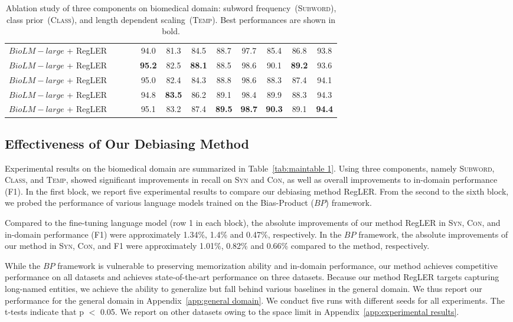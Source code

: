 \documentclass[11pt]{article}
\newcommand{\cmark}{\ding{51}}\newcommand{\xmark}{\ding{55}}\newcommand{\cross}{\ding{61}}\newcommand{\mb}[1]{\textcolor{red}{#1}}
\begin{document}
\begin{table*}[t]
\begin{adjustbox}{width=.9\textwidth}
\begin{tabular}{ l c c c c c c c | c c c c }
$BioLM-large$ + RegLER & \xmark & \xmark & \cmark & 94.0 & 81.3 & 84.5 & 88.7 & 97.7 & 85.4 & 86.8 & 93.8 \\ 
$BioLM-large$ + RegLER & \cmark & \cmark & \xmark & \textbf{95.2} & 82.5 & \textbf{88.1} & 88.5 & 98.6 & 90.1 & \textbf{89.2} & 93.6 \\ 
$BioLM-large$ + RegLER & \cmark & \xmark & \cmark & 95.0 & 82.4 & 84.3 & 88.8 & 98.6 & 88.3 & 87.4 & 94.1 \\ 
$BioLM-large$ + RegLER & \xmark & \cmark & \cmark & 94.8 & \textbf{83.5} & 86.2 & 89.1 & 98.4 & 89.9 & 88.3 &  94.3 \\
$BioLM-large$ + RegLER & \cmark & \cmark & \cmark & 95.1 & 83.2 & 87.4 & \textbf{89.5} & \textbf{98.7} & \textbf{90.3} & 89.1 & \textbf{94.4} \\
\bottomrule
\end{tabular}
\end{adjustbox}
\caption{Ablation study of three components on biomedical domain: subword frequency~(\textsc{Subword}), class prior~(\textsc{Class}), and length dependent scaling~(\textsc{Temp}). Best performances are shown in bold.}
\label{tab:ablation table 1}
\end{table*}


\subsection{Effectiveness of Our Debiasing Method}
Experimental results on the biomedical domain are summarized in Table~\ref{tab:maintable 1}.
Using three components, namely \textsc{Subword}, \textsc{Class}, and \textsc{Temp}, showed significant improvements in recall on \textsc{Syn} and \textsc{Con}, as well as overall improvements to in-domain performance (F1).
In the first block, we report five experimental results to compare our debiasing method RegLER.
From the second to the sixth block, we probed the performance of various language models trained on the Bias-Product ($BP$) framework.

Compared to the fine-tuning language model (row 1 in each block), the absolute improvements of our method RegLER in \textsc{Syn}, \textsc{Con}, and in-domain performance (F1) were approximately 1.34\%, 1.4\% and 0.47\%, respectively.
In the $BP$ framework, the absolute improvements of our method in \textsc{Syn}, \textsc{Con}, and F1 were approximately 1.01\%, 0.82\% and 0.66\% compared to the \cite{kim2021your} method, respectively.

While the $BP$ framework is vulnerable to preserving memorization ability and in-domain performance, our method achieves competitive performance on all datasets and achieves state-of-the-art performance on three datasets.
Because our method RegLER targets capturing long-named entities, we achieve the ability to generalize but fall behind various baselines in the general domain.
We thus report our performance for the general domain in Appendix~\ref{app:general domain}.
We conduct five runs with different seeds for all experiments.
The t-tests indicate that p $<$ 0.05.
We report on other datasets owing to the space limit in Appendix~\ref{app:experimental results}.
\end{document}
